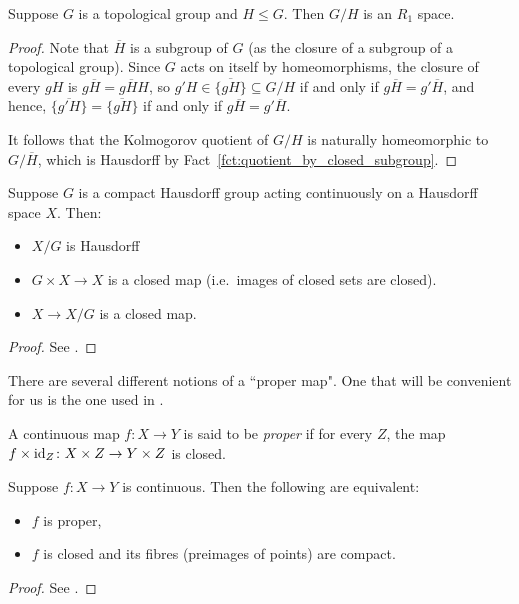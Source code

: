 	\begin{prop}
		\label{prop:top_gp_R1}
		Suppose $G$ is a topological group and $H\leq G$. Then $G/H$ is an $R_1$ space.
	\end{prop}
	\begin{proof}
		Note that $\overline H$ is a subgroup of $G$ (as the closure of a subgroup of a topological group). Since $G$ acts on itself by homeomorphisms, the closure of every $gH$ is $g\overline H=g\overline{H}H$, so $g'H\in \overline{\{gH\}}\subseteq G/H$ if and only if $g\overline H=g'\overline H$, and hence, $\overline{\{g'H\}}=\overline{\{gH\}}$ if and only if $g\overline H=g'\overline H$.
		
		It follows that the Kolmogorov quotient of $G/H$ is naturally homeomorphic to $G/\overline H$, which is Hausdorff by Fact~\ref{fct:quotient_by_closed_subgroup}.
	\end{proof}
	
	
	\begin{fct}
		\label{fct:cpct_action}
		Suppose $G$ is a compact Hausdorff group acting continuously on a Hausdorff space $X$. Then:
		\begin{itemize}
			\item
			$X/G$ is Hausdorff
			\item
			$G\times X\to X$ is a closed map (i.e.\ images of closed sets are closed).
			\item
			$X\to X/G$ is a closed map.
		\end{itemize}
	\end{fct}
	\begin{proof}
		See \cite[Theorems 1.2 and 3.1]{GB72}.
	\end{proof}
	
	
	There are several different notions of a ``proper map". One that will be convenient for us is the one used in \cite{NB66}.
	
	\begin{dfn}
		A continuous map $f\colon X\to Y$ is said to be \emph{proper} if for every $Z$, the map $f\times \operatorname{{id}}_Z\colon X\times Z\to Y\times Z$ is closed.\xqed{\lozenge}
	\end{dfn}
	
	
	\begin{fct}
		\label{fct:proper}
		Suppose $f\colon X\to Y$ is continuous. Then the following are equivalent:
		\begin{itemize}
			\item
			$f$ is proper,
			\item
			$f$ is closed and its fibres (preimages of points) are compact.
		\end{itemize}
	\end{fct}
	\begin{proof}
		See \cite[Theorem 1 in \S10.2 of Chapter I]{NB66}.
	\end{proof}
	
